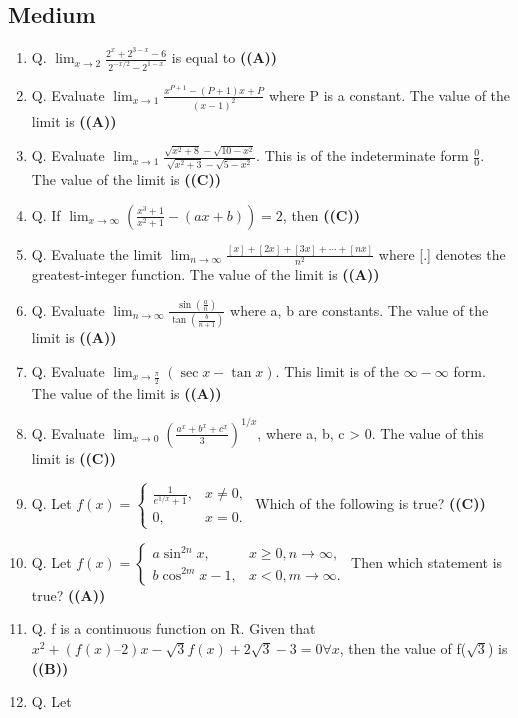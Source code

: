 \documentclass{article}
\begin{document}
\subsection{Medium}
\begin{enumerate}
\item Q. $\lim_{x\to 2} \frac{2^x+2^{3-x}-6}{2^{-x/2}-2^{1-x}}$ is equal to \hfill \textbf{((A))}
\item Q. Evaluate $\lim_{x\to 1} \frac{x^{P+1}-(P+1)x+P}{(x-1)^2}$ where P is a constant. The value of the limit is \hfill \textbf{((A))}
\item Q. Evaluate $\lim_{x\to 1} \frac{\sqrt{x^2+8}-\sqrt{10-x^2}}{\sqrt{x^2+3}-\sqrt{5-x^2}}$. This is of the indeterminate form $\frac{0}{0}$. The value of the limit is \hfill \textbf{((C))}
\item Q. If $\lim_{x\to\infty} (\frac{x^3+1}{x^2+1}-(ax+b)) = 2$, then \hfill \textbf{((C))}
\item Q. Evaluate the limit $\lim_{n\to\infty} \frac{[x]+[2x]+[3x]+\cdots+[nx]}{n^2}$ where [.] denotes the greatest-integer function. The value of the limit is \hfill \textbf{((A))}
\item Q. Evaluate $\lim_{n\to\infty} \frac{\sin(\frac{a}{n})}{\tan(\frac{b}{n+1})}$ where a, b are constants. The value of the limit is \hfill \textbf{((A))}
\item Q. Evaluate $\lim_{x\to\frac{\pi}{2}} (\sec x - \tan x)$. This limit is of the $\infty-\infty$ form. The value of the limit is \hfill \textbf{((A))}
\item Q. Evaluate $\lim_{x\to 0} (\frac{a^x+b^x+c^x}{3})^{1/x}$, where a, b, c > 0. The value of this limit is \hfill \textbf{((C))}
\item Q. Let $f(x) = \begin{cases} \frac{1}{e^{1/x}+1}, & x \ne 0, \\ 0, & x = 0. \end{cases}$ Which of the following is true? \hfill \textbf{((C))}
\item Q. Let $f(x) = \begin{cases} a \sin^{2n} x, & x \ge 0, n \to \infty, \\ b \cos^{2m} x - 1, & x < 0, m \to \infty. \end{cases}$ Then which statement is true? \hfill \textbf{((A))}
\item Q. f is a continuous function on R. Given that $x^2 + (f(x) – 2) x - \sqrt{3} f(x) + 2\sqrt{3}-3 = 0 \forall x$, then the value of f($\sqrt{3}$) is \hfill \textbf{((B))}
\item Q. Let

\end{enumerate}
\end{document}
